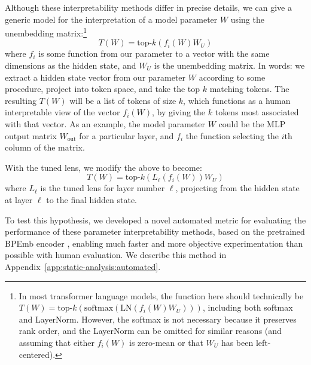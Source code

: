 \documentclass{article}
\theoremstyle{plain}
\theoremstyle{definition}
\begin{document}
Although these interpretability methods differ in precise details, we can give a generic model for the interpretation of a model parameter $W$ using the unembedding matrix:\footnote{In most transformer language models, the function here should technically be $T(W) = \text{top-}k(\text{softmax}(\text{LN}(f_i(W)W_U)))$, including both softmax and LayerNorm. However, the softmax is not necessary because it preserves rank order, and the LayerNorm can be omitted for similar reasons (and assuming that either $f_i(W)$ is zero-mean or that $W_U$ has been left-centered).}
$$T(W) = \text{top-}k(f_i(W)W_U) $$
where $f_i$ is some function from our parameter to a vector with the same dimensions as the hidden state, and $W_U$ is the unembedding matrix. In words: we extract a hidden state vector from our parameter $W$ according to some procedure, project into token space, and take the top $k$ matching tokens. The resulting $T(W)$ will be a list of tokens of size $k$, which functions as a human interpretable view of the vector $f_i(W)$, by giving the $k$ tokens most associated with that vector. As an example, the model parameter $W$ could be the MLP output matrix $W_{\text{out}}$ for a particular layer, and $f_i$ the function selecting the $i$th column of the matrix.

With the tuned lens, we modify the above to become:
$$T(W) = \text{top-}k(L_\ell(f_i(W)) W_U) $$
where $L_\ell$ is the tuned lens for layer number $\ell$, projecting from the hidden state at layer $\ell$ to the final hidden state.

To test this hypothesis, we developed a novel automated metric for evaluating the performance of these parameter interpretability methods, based on the pretrained BPEmb encoder \citep{heinzerling2018bpemb}, enabling much faster and more objective experimentation than possible with human evaluation. We describe this method in Appendix~\ref{app:static-analysis:automated}.
\end{document}
